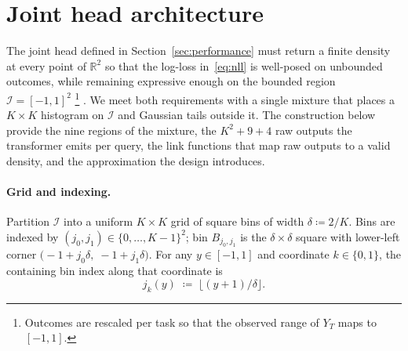 \documentclass[11pt]{article}
\begin{document}
\section{Joint head architecture}
\label{app:head-spec}

The joint head defined in Section~\ref{sec:performance} must return a
finite density at every point of $\mathbb{R}^{2}$ so that the log-loss
in~\eqref{eq:nll} is well-posed on unbounded outcomes, while remaining
expressive enough on the bounded region $\mathcal{I} = [-1, 1]^{2}$ \footnote{Outcomes are
rescaled per task so that the observed range of $Y_{T}$ maps to
$[-1, 1]$.} . We meet both requirements with a single mixture that places a $K \times K$ histogram on
$\mathcal{I}$ and Gaussian tails outside it. The construction below provide the nine regions of the mixture, the $K^{2} + 9 + 4$ raw outputs the transformer emits per query, the link functions that map raw outputs to a valid density, and the approximation the design introduces.

\paragraph{Grid and indexing.}
Partition $\mathcal{I}$ into a uniform $K \times K$ grid of square bins
of width $\delta \coloneqq 2/K$. Bins are indexed by
$(j_{0}, j_{1}) \in \{0, \ldots, K-1\}^{2}$; bin $B_{j_{0}, j_{1}}$ is
the $\delta \times \delta$ square with lower-left corner
$\bigl(-1 + j_{0}\delta,\; -1 + j_{1}\delta\bigr)$. For any
$y \in [-1, 1]$ and coordinate $k \in \{0, 1\}$, the containing bin index
along that coordinate is
\begin{equation}
  j_{k}(y) \;\coloneqq\; \lfloor (y + 1) / \delta \rfloor.
  \label{eq:bin-index}
\end{equation}
\end{document}
